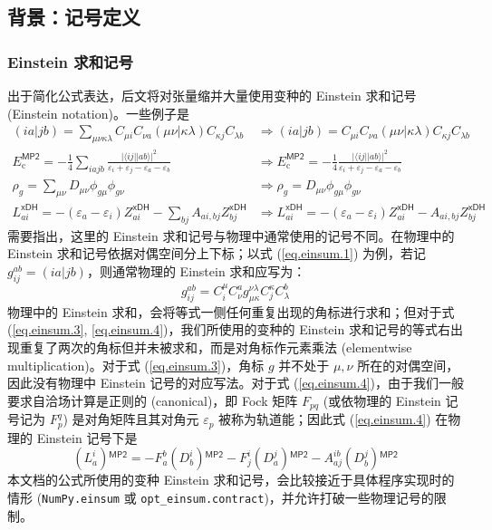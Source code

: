 \subsection{背景：记号定义}

\subsubsection{Einstein 求和记号}

出于简化公式表达，后文将对张量缩并大量使用变种的 Einstein 求和记号 (Einstein notation)。一些例子是
\begin{align}
  \label{eq.einsum.1}
  (ia|jb) = \sum_{\mu \nu \kappa \lambda} C_{\mu i} C_{\nu a} (\mu \nu | \kappa \lambda) C_{\kappa j} C_{\lambda b}
  &\Rightarrow 
  (ia|jb) = C_{\mu i} C_{\nu a} (\mu \nu | \kappa \lambda) C_{\kappa j} C_{\lambda b} \\
  \label{eq.einsum.2}
  E_\mathrm{c}^\textsf{MP2} = - \frac{1}{4} \sum_{iajb} \frac{\big| \langle i j || a b \rangle \big|^2}{\varepsilon_i + \varepsilon_j - \varepsilon_a - \varepsilon_b}
  &\Rightarrow
  E_\mathrm{c}^\textsf{MP2} = - \frac{1}{4} \frac{\big| \langle i j || a b \rangle \big|^2}{\varepsilon_i + \varepsilon_j - \varepsilon_a - \varepsilon_b} \\
  \label{eq.einsum.3}
  \rho_g = \sum_{\mu \nu} D_{\mu \nu} \phi_{g \mu} \phi_{g \nu}
  &\Rightarrow
  \rho_g = D_{\mu \nu} \phi_{g \mu} \phi_{g \nu} \\
  \label{eq.einsum.4}
  L_{ai}^\textsf{xDH} = - (\varepsilon_a - \varepsilon_i) Z_{ai}^\textsf{xDH} - \sum_{bj} A_{ai, bj} Z_{bj}^\textsf{xDH}
  &\Rightarrow
  L_{ai}^\textsf{xDH} = - (\varepsilon_a - \varepsilon_i) Z_{ai}^\textsf{xDH} - A_{ai, bj} Z_{bj}^\textsf{xDH}
\end{align}
需要指出，这里的 Einstein 求和记号与物理中通常使用的记号不同\cite{Einstein-Einstein.AP.1916}。在物理中的 Einstein 求和记号依据对偶空间分上下标；以式 (\ref{eq.einsum.1}) 为例，若记 $g_{ij}^{ab} = (ia|jb)$，则通常物理的 Einstein 求和应写为：
\begin{equation*}
  g_{ij}^{ab} = C^\mu_i C^a_\nu g^{\nu \lambda}_{\mu \kappa} C^\kappa_j C^b_\lambda
\end{equation*}
物理中的 Einstein 求和，会将等式一侧任何重复出现的角标进行求和；但对于式 (\ref{eq.einsum.3}, \ref{eq.einsum.4})，我们所使用的变种的 Einstein 求和记号的等式右出现重复了两次的角标但并未被求和，而是对角标作元素乘法 (elementwise multiplication)。对于式 (\ref{eq.einsum.3})，角标 $g$ 并不处于 $\mu, \nu$ 所在的对偶空间，因此没有物理中 Einstein 记号的对应写法。对于式 (\ref{eq.einsum.4})，由于我们一般要求自洽场计算是正则的 (canonical)，即 Fock 矩阵 $F_{pq}$ (或依物理的 Einstein 记号记为 $F_p^q$) 是对角矩阵且其对角元 $\varepsilon_p$ 被称为轨道能；因此式 (\ref{eq.einsum.4}) 在物理的 Einstein 记号下是
\begin{equation*}
  (L_a^i){}^\textsf{MP2} = - F_a^b (D_b^i){}^\textsf{MP2} - F_j^i (D_a^j){}^\textsf{MP2} - A_{aj}^{ib} (D_b^j){}^\textsf{MP2}
\end{equation*}
本文档的公式所使用的变种 Einstein 求和记号，会比较接近于具体程序实现时的情形 (\verb|NumPy.einsum| 或 \verb|opt_einsum.contract|)，并允许打破一些物理记号的限制。


